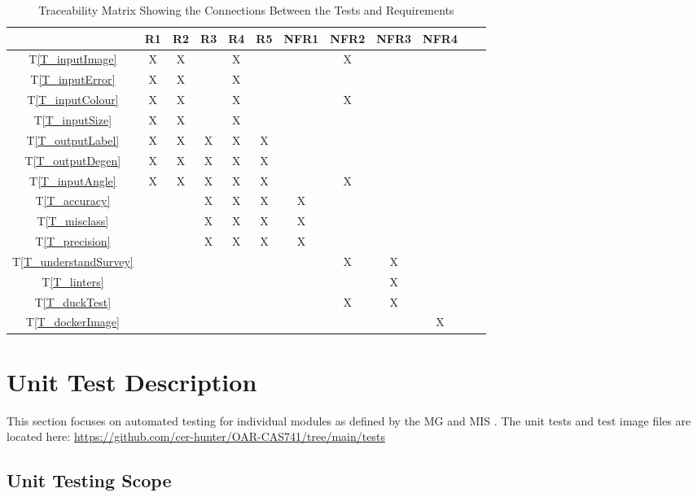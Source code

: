 \documentclass[12pt, titlepage]{article}
\newcommand{\tref}[1]{T\ref{#1}}
\begin{document}
\begin{table}[h!]
  \centering
  \begin{tabular}{|c|c|c|c|c|c|c|c|c|c|c|c|}
  \hline
    & R1
    & R2
    & R3
    & R4
    & R5
    & NFR1
    & NFR2
    & NFR3
    & NFR4
  \\ \hline
  \tref{T_inputImage}           &X&X& &X& & &X& & \\ \hline
  \tref{T_inputError}           &X&X& &X& & & & & \\ \hline
  \tref{T_inputColour}          &X&X& &X& & &X& & \\ \hline
  \tref{T_inputSize}            &X&X& &X& & & & & \\ \hline
  \tref{T_outputLabel}          &X&X&X&X&X& & & & \\ \hline
  \tref{T_outputDegen}          &X&X&X&X&X& & & & \\ \hline
  \tref{T_inputAngle}           &X&X&X&X&X& &X& & \\ \hline
  \tref{T_accuracy}             & & &X&X&X&X& & & \\ \hline
  \tref{T_misclass}             & & &X&X&X&X& & & \\ \hline
  \tref{T_precision}            & & &X&X&X&X& & & \\ \hline
  \tref{T_understandSurvey}     & & & & & & &X&X& \\ \hline
  \tref{T_linters}              & & & & & & & &X& \\ \hline
  \tref{T_duckTest}             & & & & & & &X&X& \\ \hline
  \tref{T_dockerImage}          & & & & & & & & &X\\ \hline
  \end{tabular}
  \caption{Traceability Matrix Showing the Connections Between the Tests and Requirements}
  \label{Table:A_trace}
\end{table}

\newpage


\section{Unit Test Description}

This section focuses on automated testing for individual modules as defined by the
MG \cite{MG} and MIS \cite{MIS}.
The unit tests and test image files are located here:
\url{https://github.com/cer-hunter/OAR-CAS741/tree/main/tests}

\subsection{Unit Testing Scope}
\end{document}
